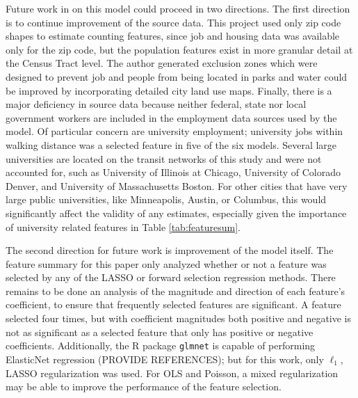 \documentclass[11pt]{article}
\begin{document}
Future work in on this model could proceed in two directions. The first direction is to continue improvement of the source data. This project used only zip code shapes to estimate counting features, since job and housing data was available only for the zip code, but the population features exist in more granular detail at the Census Tract level. The author generated exclusion zones which were designed to prevent job and people from being located in parks and water could be improved by incorporating detailed city land use maps. Finally, there is a major deficiency in source data because neither federal, state nor local government workers are included in the employment data sources used by the model. Of particular concern are university employment; university jobs within walking distance was a selected feature in five of the six models. Several large universities are located on the transit networks of this study and were not accounted for, such as University of Illinois at Chicago, University of Colorado  Denver, and University of Massachusetts Boston. For other cities that have very large public universities, like Minneapolis, Austin, or Columbus, this would significantly affect the validity of any estimates, especially given the importance of university related features in Table \ref{tab:featuresum}.

The second direction for future work is improvement of the model itself. The feature summary for this paper only analyzed whether or not a feature was selected by any of the LASSO or forward selection regression methods. There remains to be done an analysis of the magnitude and direction of each feature's coefficient, to ensure that frequently selected features are significant. A feature selected four times, but with coefficient magnitudes both positive and negative is not as significant as a selected feature that only has positive or negative coefficients. Additionally, the R package \texttt{glmnet} is capable of performing ElasticNet regression (PROVIDE REFERENCES); but for this work, only $\ell_1$, LASSO regularization was used. For OLS and Poisson, a mixed regularization may be able to improve the performance of the feature selection. 
\end{document}
